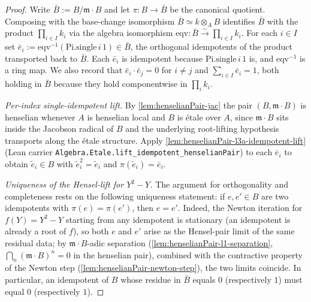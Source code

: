 \begin{proof}
  \leanok
  Write $\bar B := B / \mathfrak{m} \cdot B$ and let
  $\pi : B \to \bar B$ be the canonical quotient. Composing with the
  base-change isomorphism $\bar B \simeq k \otimes_A B$ identifies
  $\bar B$ with the product $\prod_{i \in I} k_i$ via the algebra
  isomorphism $\mathrm{eqv} : \bar B \xrightarrow{\sim}
  \prod_{i \in I} k_i$. For each $i \in I$ set
  $\bar e_i := \mathrm{eqv}^{-1}(\mathrm{Pi.single}\,i\,1) \in \bar B$,
  the orthogonal idempotents of the product transported back to
  $\bar B$. Each $\bar e_i$ is idempotent because
  $\mathrm{Pi.single}\,i\,1$ is, and $\mathrm{eqv}^{-1}$ is a ring map.
  We also record that
  $\bar e_i \cdot \bar e_j = 0$ for $i \ne j$ and
  $\sum_{i \in I} \bar e_i = 1$, both holding in $\bar B$ because they
  hold componentwise in $\prod_i k_i$.

  \medskip

  \emph{Per-index single-idempotent lift.} By
  \cref{lem:henselianPair-jac} the pair
  $(B, \mathfrak{m} \cdot B)$ is henselian whenever $A$ is henselian
  local and $B$ is étale over $A$, since
  $\mathfrak{m} \cdot B$ sits inside the Jacobson radical of $B$ and
  the underlying root-lifting hypothesis transports along the étale
  structure. Apply
  \cref{lem:henselianPair-l3a-idempotent-lift}
  (Lean carrier \texttt{Algebra.Etale.lift\_idempotent\_henselianPair})
  to each $\bar e_i$ to obtain
  $\tilde e_i \in B$ with $\tilde e_i^2 = \tilde e_i$ and
  $\pi(\tilde e_i) = \bar e_i$.

  \medskip

  \emph{Uniqueness of the Hensel-lift for $Y^2 - Y$.} The argument
  for orthogonality and completeness rests on the following
  uniqueness statement: if $e, e' \in B$ are two idempotents with
  $\pi(e) = \pi(e')$, then $e = e'$. Indeed, the Newton iteration
  for $f(Y) = Y^2 - Y$ starting from any idempotent is stationary
  (an idempotent is already a root of $f$), so both $e$ and $e'$
  arise as the Hensel-pair limit of the same residual data;
  by $\mathfrak{m} \cdot B$-adic separation
  (\cref{lem:henselianPair-l1-separation},
  $\bigcap_n (\mathfrak{m} \cdot B)^n = 0$ in the henselian pair),
  combined with the contractive property of the Newton step
  (\cref{lem:henselianPair-newton-step}), the two limits coincide.
  In particular, an idempotent of $B$ whose residue in $\bar B$
  equals $0$ (respectively $1$) must equal $0$ (respectively $1$).


\end{proof}
